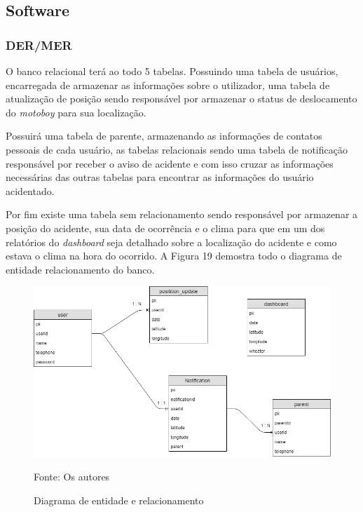 \subsection{\textbf{Software}}
\subsubsection{DER/MER}


O banco relacional terá ao todo 5 tabelas. Possuindo uma tabela de usuários, encarregada de armazenar as informações sobre o utilizador, uma tabela de atualização de posição sendo responsável por armazenar o status de deslocamento do \textit{motoboy} para sua localização.

Possuirá uma tabela de parente, armazenando as informações de contatos pessoais de cada usuário, as tabelas relacionais sendo uma tabela de notificação responsável por receber o aviso de acidente e com isso cruzar as informações necessárias das outras tabelas para encontrar as informações do usuário acidentado.

Por fim existe uma tabela sem relacionamento sendo responsável por armazenar a posição do acidente, sua data de ocorrência e o clima para que em um dos relatórios do \textit{dashboard} seja detalhado sobre a localização do acidente e como estava o clima na hora do ocorrido. A Figura 19 demostra todo o diagrama de entidade relacionamento do banco.



\begin{figure}[H]

 \caption{Diagrama de entidade e relacionamento}
\begin{center}
  \includegraphics[width=150mm]{images/Cap3/ER.png}
  \end{center}
     Fonte: Os autores 
\end{figure}

